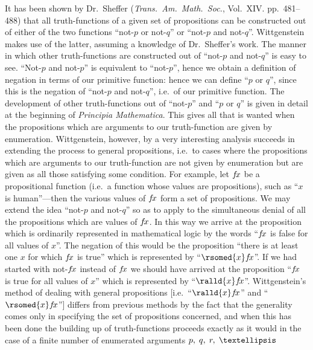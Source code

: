 It has been shown by Dr.\ Sheffer (\emph{Trans.\ Am.\ Math.\ Soc.}, Vol.\ XIV. pp.\ 481–488) that all truth-functions of a given set of propositions can be constructed out of either of the two functions “not-$p$ or not-$q$” or “not-$p$ and not-$q$”. Wittgenstein makes use of the latter, assuming a knowledge of Dr.\ Sheffer’s work. The manner in which other truth-functions are constructed out of “not-$p$ and not-$q$” is easy to see. “Not-$p$ and not-$p$” is equivalent to “not-$p$”, hence we obtain a definition of negation in terms of our primitive function: hence we can define “$p$ or $q$”, since this is the negation of “not-$p$ and not-$q$”, i.e.\ of our primitive function. The development of other truth-functions out of “not-$p$” and “$p$ or $q$” is given in detail at the beginning of \emph{Principia Mathematica}. This gives all that is wanted when the propositions which are arguments to our truth-function are given by enumeration. Wittgenstein, however, by a very interesting analysis succeeds in extending the process to general propositions, i.e.\ to cases where the propositions which are arguments to our truth-function are not given by enumeration but are given as all those satisfying some condition. For example, let $f\negthinspace x$ be a propositional function (i.e.\ a function whose values are propositions), such as “$x$ is human”—then the various values of $f\negthinspace x$ form a set of propositions. We may extend the idea “not-$p$ and not-$q$” so as to apply to the simultaneous denial of all the propositions which are values of $f\negthinspace x$. In this way we arrive at the proposition which is ordinarily represented in mathematical logic by the words “$f\negthinspace x$ is false for all values of $x$”. The negation of this would be the proposition “there is at least one $x$ for which $f\negthinspace x$ is true” which is represented by “$\rsomed{x} f\negthinspace x$”. If we had started with not-$f\negthinspace x$ instead of $f\negthinspace x$ we should have arrived at the proposition “$f\negthinspace x$ is true for all values of $x$” which is represented by “$\ralld{x} f\negthinspace x$”. Wittgenstein’s method of dealing with general propositions [i.e.\ “$\ralld{x} f\negthinspace x$” and “$\rsomed{x} f\negthinspace x$”] differs from previous methods by the fact that the generality comes only in specifying the set of propositions concerned, and when this has been done the building up of truth-functions proceeds exactly as it would in the case of a finite number of enumerated arguments $p,\thickspace q,\thickspace r,\thickspace …$


